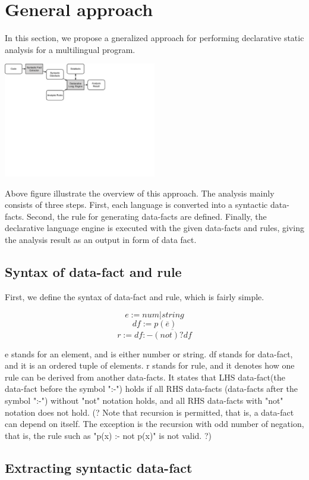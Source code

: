 \section{General approach}

In this section, we propose a gneralized approach for performing declarative
static analysis for a multilingual program.

\includegraphics[width=0.5\textwidth]{img/overview}

Above figure illustrate the overview of this approach. The analysis mainly
consists of three steps. First, each language is converted into a syntactic
data-facts. Second, the rule for generating data-facts are defined. Finally,
the declarative language engine is executed with the given data-facts and
rules, giving the analysis result as an output in form of data fact.

\subsection{Syntax of data-fact and rule}

First, we define the syntax of data-fact and rule, which is fairly simple.

\[e := num | string\]
\[df := p(\overline{e})\]
\[r := df :- \overline{(not)? df}\]

e stands for an element, and is either number or string.  df stands for
data-fact, and it is an ordered tuple of elements.  r stands for rule, and it
denotes how one rule can be derived from another data-facts.  It states that
LHS data-fact(the data-fact before the symbol ":-") holds if all RHS data-facts
(data-facts after the symbol ":-") without "not" notation holds, and all RHS
data-facts with "not" notation does not hold.  (? Note that recursion is
permitted, that is, a data-fact can depend on itself.  The exception is the
recursion with odd number of negation, that is, the rule such as "p(x) :- not
p(x)" is not valid. ?)

\subsection{Extracting syntactic data-fact}


